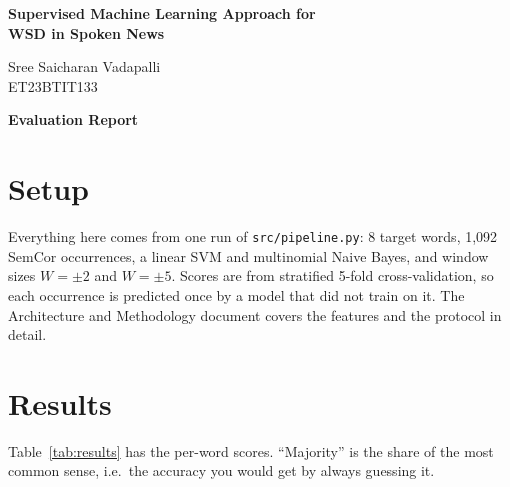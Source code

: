 \documentclass[11pt]{article}
\begin{document}
\begin{titlepage}
\centering
\vspace*{\fill}
{\LARGE\bfseries Supervised Machine Learning Approach for\\
WSD in Spoken News\par}
\vspace{3em}
{\large Sree Saicharan Vadapalli\\ ET23BTIT133\par}
\vspace*{\fill}
\end{titlepage}

\begin{center}
{\LARGE\bfseries Evaluation Report\par}
\end{center}
\vspace{1em}

\section{Setup}

Everything here comes from one run of \texttt{src/pipeline.py}: 8 target words,
1,092 SemCor occurrences, a linear SVM and multinomial Naive Bayes, and window
sizes $W = \pm 2$ and $W = \pm 5$. Scores are from stratified 5-fold
cross-validation, so each occurrence is predicted once by a model that did not
train on it. The Architecture and Methodology document covers the features and
the protocol in detail.

\section{Results}

Table~\ref{tab:results} has the per-word scores. ``Majority'' is the share of
the most common sense, i.e.\ the accuracy you would get by always guessing it.
\end{document}
